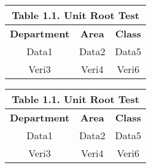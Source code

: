\documentclass[10pt,a4paper]{article}
\begin{document}
\begin{sideways}
	
	
	\begin{tabular}{|c|c|c|}
		
		\multicolumn{3}{c}{\textbf{Table 1.1. Unit Root Test}} \\[1ex]
		
		
		\hline
		\textbf{Department} & \textbf{Area} & \textbf{Class} \\ \cline{1-3}
		\hline
		Data1 & Data2 & Data5 \\
		\hline
		Veri3 & Veri4 & Veri6 \\ \hline
		
	\end{tabular}
	
	
\end{sideways}


\begin{rotate}{45}
	
	
	\begin{tabular}{|c|c|c|}
		
		\multicolumn{3}{c}{\textbf{Table 1.1. Unit Root Test}} \\[1ex]
		
		
		\hline
		\textbf{Department} & \textbf{Area} & \textbf{Class} \\ \cline{1-3}
		\hline
		Data1 & Data2 & Data5 \\
		\hline
		Veri3 & Veri4 & Veri6 \\ \hline
		
	\end{tabular}
	
\end{rotate}
\end{document}
